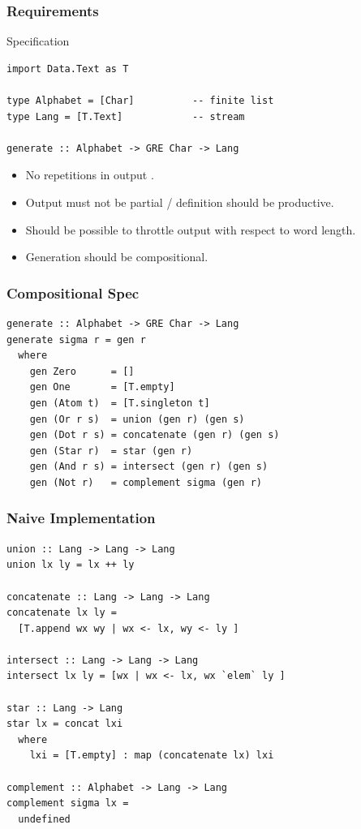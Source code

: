 \documentclass[pdftex]{beamer}
\begin{document}
\begin{frame}[fragile]
  \frametitle{Requirements}
  \begin{block}{Specification}
\begin{lstlisting}[numbers=none]
import Data.Text as T

type Alphabet = [Char]          -- finite list
type Lang = [T.Text]            -- stream

generate :: Alphabet -> GRE Char -> Lang
\end{lstlisting}
  \end{block}
  \begin{itemize}
  \item No repetitions in output .
  \item Output must not be partial / definition should be productive.
  \item Should be possible to throttle output with respect to word length.
  \item Generation should be compositional.
  \end{itemize}
\end{frame}
\begin{frame}[fragile]
  \frametitle{Compositional Spec}
\begin{lstlisting}[numbers=none]
generate :: Alphabet -> GRE Char -> Lang
generate sigma r = gen r
  where
    gen Zero      = []
    gen One       = [T.empty]
    gen (Atom t)  = [T.singleton t]
    gen (Or r s)  = union (gen r) (gen s)
    gen (Dot r s) = concatenate (gen r) (gen s)
    gen (Star r)  = star (gen r)
    gen (And r s) = intersect (gen r) (gen s)
    gen (Not r)   = complement sigma (gen r)
\end{lstlisting}
\end{frame}
\begin{frame}[fragile]
  \frametitle{Naive Implementation}
\vspace{-2\baselineskip}
\begin{lstlisting}[numbers=none]
union :: Lang -> Lang -> Lang
union lx ly = lx ++ ly

concatenate :: Lang -> Lang -> Lang
concatenate lx ly =
  [T.append wx wy | wx <- lx, wy <- ly ]

intersect :: Lang -> Lang -> Lang
intersect lx ly = [wx | wx <- lx, wx `elem` ly ]

star :: Lang -> Lang
star lx = concat lxi
  where
    lxi = [T.empty] : map (concatenate lx) lxi

complement :: Alphabet -> Lang -> Lang
complement sigma lx =
  undefined
\end{lstlisting}
\end{frame}
\end{document}
